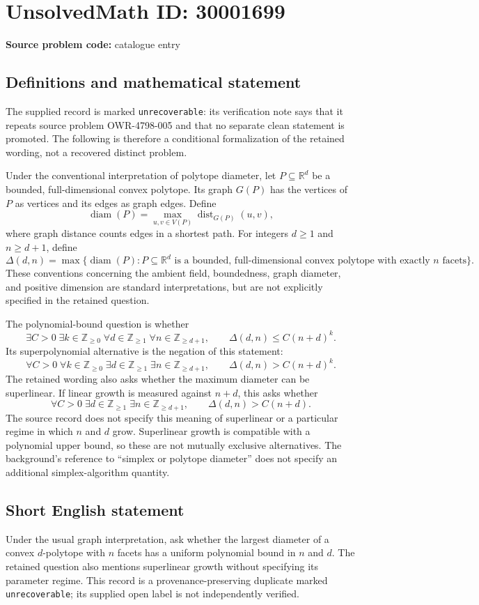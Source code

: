 \documentclass[11pt]{article}
\newcommand{\Z}{\mathbb{Z}}
\newcommand{\R}{\mathbb{R}}
\begin{document}
\section*{UnsolvedMath ID: 30001699}
\textbf{Source problem code:} catalogue entry
\subsection{Definitions and mathematical statement}
The supplied record is marked \texttt{unrecoverable}: its verification note says that it repeats source problem OWR-4798-005 and that no separate clean statement is promoted. The following is therefore a conditional formalization of the retained wording, not a recovered distinct problem.

Under the conventional interpretation of polytope diameter, let \(P\subseteq\R^d\) be a bounded, full-dimensional convex polytope. Its graph \(G(P)\) has the vertices of \(P\) as vertices and its edges as graph edges. Define
\[
\operatorname{diam}(P)=\max_{u,v\in V(P)}\operatorname{dist}_{G(P)}(u,v),
\]
where graph distance counts edges in a shortest path. For integers \(d\geq1\) and \(n\geq d+1\), define
\[
\Delta(d,n)=\max\{\operatorname{diam}(P):P\subseteq\R^d\text{ is a bounded, full-dimensional convex polytope with exactly }n\text{ facets}\}.
\]
These conventions concerning the ambient field, boundedness, graph diameter, and positive dimension are standard interpretations, but are not explicitly specified in the retained question.

The polynomial-bound question is whether
\[
\exists C>0\;\exists k\in\Z_{\geq0}\;\forall d\in\Z_{\geq1}\;\forall n\in\Z_{\geq d+1},\qquad
\Delta(d,n)\leq C(n+d)^k.
\]
Its superpolynomial alternative is the negation of this statement:
\[
\forall C>0\;\forall k\in\Z_{\geq0}\;\exists d\in\Z_{\geq1}\;\exists n\in\Z_{\geq d+1},\qquad
\Delta(d,n)>C(n+d)^k.
\]
The retained wording also asks whether the maximum diameter can be superlinear. If linear growth is measured against \(n+d\), this asks whether
\[
\forall C>0\;\exists d\in\Z_{\geq1}\;\exists n\in\Z_{\geq d+1},\qquad
\Delta(d,n)>C(n+d).
\]
The source record does not specify this meaning of superlinear or a particular regime in which \(n\) and \(d\) grow. Superlinear growth is compatible with a polynomial upper bound, so these are not mutually exclusive alternatives. The background's reference to ``simplex or polytope diameter'' does not specify an additional simplex-algorithm quantity.
\subsection{Short English statement}
Under the usual graph interpretation, ask whether the largest diameter of a convex \(d\)-polytope with \(n\) facets has a uniform polynomial bound in \(n\) and \(d\). The retained question also mentions superlinear growth without specifying its parameter regime. This record is a provenance-preserving duplicate marked \texttt{unrecoverable}; its supplied open label is not independently verified.
\end{document}
